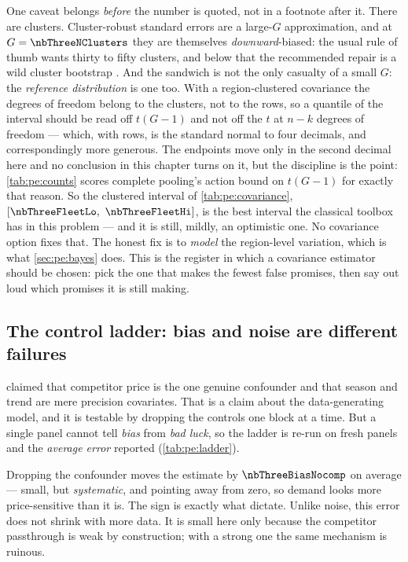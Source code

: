 One caveat belongs \emph{before} the number is quoted, not in a footnote after it. There are
\nbThreeNClusters{} clusters. Cluster-robust standard errors are a large-$G$ approximation, and at
$G = \nbThreeNClusters$ they are themselves \emph{downward}-biased: the usual rule of thumb wants
thirty to fifty clusters, and below that the recommended repair is a wild cluster bootstrap
\citep{cameron2008, cameron2015}. And the sandwich is not the only casualty of a small $G$: the
\emph{reference distribution} is one too. With a region-clustered covariance the degrees of freedom
belong to the clusters, not to the rows, so a quantile of the interval should be read off $t(G-1)$
and not off the $t$ at $n-k$ degrees of freedom --- which, with \nbThreeNObs{} rows, is the standard
normal to four decimals, and correspondingly more generous. The endpoints move only in the second
decimal here and no conclusion in this chapter turns on it, but the discipline is the point:
\cref{tab:pe:counts} scores complete pooling's action bound on $t(G-1)$ for exactly that reason. So
the
clustered interval of \cref{tab:pe:covariance}, $[\nbThreeFleetLo,\ \nbThreeFleetHi]$, is the best
interval the classical toolbox has in this problem --- and it is still, mildly, an optimistic one.
No covariance option fixes that. The honest
fix is to \emph{model} the region-level variation, which is what \cref{sec:pe:bayes} does. This is
the register in which a covariance estimator should be chosen: pick the one that makes the fewest
false promises, then say out loud which promises it is still making.

\subsection*{The control ladder: bias and noise are different failures}

 claimed that competitor price is the one genuine confounder and that season and
trend are mere precision covariates. That is a claim about the data-generating model, and it is
testable by dropping the controls one block at a time. But a single panel cannot tell \emph{bias}
from \emph{bad luck}, so the ladder is re-run on \nbThreeNseed{} fresh panels and the \emph{average
error} reported (\cref{tab:pe:ladder}).



Dropping the confounder moves the estimate by $\nbThreeBiasNocomp$ on average --- small, but
\emph{systematic}, and pointing away from zero, so demand looks more price-sensitive than it is.
The sign is exactly what  dictate. Unlike noise, this error
does not shrink with more data. It is small here only because the competitor passthrough is weak by
construction; with a strong one the same mechanism is ruinous.

